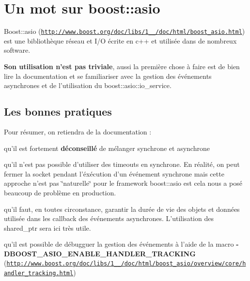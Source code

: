  \hypertarget{index_sec_boost}{}\section{Un mot sur boost\-::asio}\label{index_sec_boost}




Boost\-::asio (\href{http://www.boost.org/doc/libs/1_48_0/doc/html/boost_asio.html}{\tt http\-://www.\-boost.\-org/doc/libs/1\-\_\-\_/doc/html/boost\-\_\-asio.\-html}) est une bibliothèque réseau et I/\-O écrite en c++ et utilisée dans de nombreux software.\par
 {\bfseries Son utilisation n'est pas triviale}, aussi la première chose à faire est de bien lire la documentation et se familiariser avec la gestion des événements asynchrones et de l'utilisation du boost\-::asio\-::io\-\_\-service.\par


\par
 \hypertarget{index_ssec_boost_practice}{}\subsection{Les bonnes pratiques}\label{index_ssec_boost_practice}
Pour résumer, on retiendra de la documentation \-:


\begin{DoxyEnumerate}
\item qu'il est fortement {\bfseries déconseillé} de mélanger synchrone et asynchrone
\item qu'il n'est pas possible d'utiliser des timeouts en synchrone. En réalité, on peut fermer la socket pendant l'éxécution d'un événement synchrone mais cette approche n'est pas \char`\"{}naturelle\char`\"{} pour le framework boost\-::asio est cela nous a posé beaucoup de problème en production.
\item qu'il faut, en toutes circonstance, garantir la durée de vie des objets et données utilisée dans les callback des événements asynchrones. L'utilisation des shared\-\_\-ptr sera ici très utile.
\item qu'il est possible de débugguer la gestion des événements à l'aide de la macro {\bfseries -\/\-D\-B\-O\-O\-S\-T\-\_\-\-A\-S\-I\-O\-\_\-\-E\-N\-A\-B\-L\-E\-\_\-\-H\-A\-N\-D\-L\-E\-R\-\_\-\-T\-R\-A\-C\-K\-I\-N\-G} (\href{http://www.boost.org/doc/libs/1_48_0/doc/html/boost_asio/overview/core/handler_tracking.html}{\tt http\-://www.\-boost.\-org/doc/libs/1\-\_\-\_/doc/html/boost\-\_\-asio/overview/core/handler\-\_\-tracking.\-html})
\end{DoxyEnumerate}


